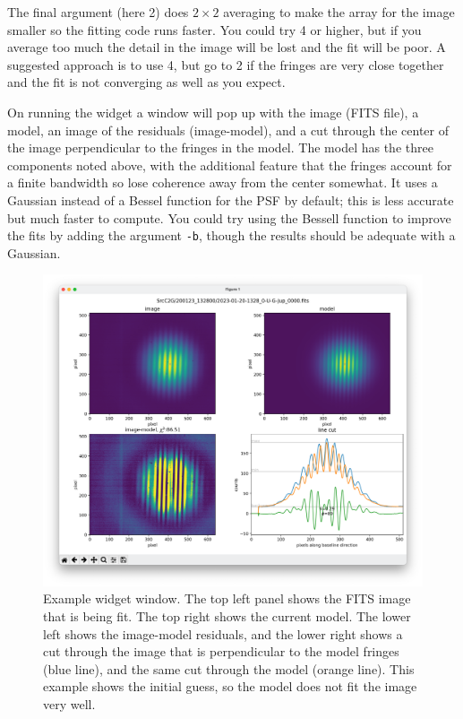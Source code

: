 \documentclass[11pt]{article}
\begin{document}
The final argument (here 2) does $2 \times 2$ averaging to make the array for the image smaller so the fitting code runs faster. You could try 4 or higher, but if you average too much the detail in the image will be lost and the fit will be poor. A suggested approach is to use 4, but go to 2 if the fringes are very close together and the fit is not converging as well as you expect.

On running the widget a window will pop up with the image (FITS file), a model, an image of the residuals (image-model), and a cut through the center of the image perpendicular to the fringes in the model. The model has the three components noted above, with the additional feature that the fringes account for a finite bandwidth so lose coherence away from the center somewhat. It uses a Gaussian instead of a Bessel function for the PSF by default; this is less accurate but much faster to compute. You could try using the Bessell function to improve the fits by adding the argument \texttt{-b}, though the results should be adequate with a Gaussian.
\begin{figure}[h!]
    \centering
    \includegraphics[width=1\textwidth]{widget.png}
    \caption{Example widget window. The top left panel shows the FITS image that is being fit. The top right shows the current model. The lower left shows the image-model residuals, and the lower right shows a cut through the image that is perpendicular to the model fringes (blue line), and the same cut through the model (orange line). This example shows the initial guess, so the model does not fit the image very well.}
    \label{fig:widget}
\end{figure}
\end{document}
